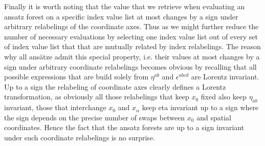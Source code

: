 \documentclass[a4paper,12pt, DIV=14, BCOR=5mm, twoside, headsepline, numbers=noenddot]{scrbook}
\begin{document}
Finally it is worth noting that the value that we retrieve when evaluating an ansatz forest on a specific index value list at most changes by a sign under arbitrary relabelings of the coordinate axes. Thus as we might further reduce the number of necessary evaluations by selecting one index value list out of every set of index value list that that are mutually related by index relabelings. The reason why all ansätze admit this special property, i.e. their values at most changes by a sign under arbitrary coordinate relabelings becomes obvious by recalling that all possible expressions that are build solely from $\eta^{ab}$ and $\epsilon^{abcd}$ are Lorentz invariant. Up to a sign the relabeling of coordinate axes clearly defines a Lorentz transformation, as obviously all those relabelings that keep $x_0$ fixed also keep $\eta_{ab}$ invariant, those that interchange $x_0$ and $x_{\alpha}$ keep eta invariant up to a sign where the sign depends on the precise number of swaps between $x_0$ and spatial coordinates. Hence the fact that the ansatz forests are up to a sign invariant under such coordinate relabelings is no surprise. \\
\end{document}
